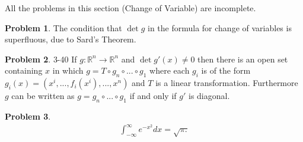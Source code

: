 \documentclass[20pt]{article}
\theoremstyle{plain}
\theoremstyle{definition}
\newtheorem*{problem}{Problem}
\newcommand{\reals}{\mathbb{R}}
\begin{document}
\color{Blue}
All the problems in this section (Change of Variable) are incomplete.
\color{Black}

\begin{problem}{3.39}
  The condition that $\det g$ in the formula for change of variables is
  superfluous, due to Sard's Theorem.
\end{problem}



\begin{problem}{3-40}
  If $g: \reals^n \to \reals^n$ and $\det g'(x) \neq 0$ then
  there is an open set containing $x$ in which
  $g = T \circ g_n \circ ... \circ g_1$ where each $g_i$
  is of the form $g_i(x) = (x^i, ..., f_i(x^i), ..., x^n)$
  and $T$ is a linear transformation.  Furthermore $g$ can be written as $g = g_n \circ...\circ g_1$ if and only if $g'$ is
  diagonal.
\end{problem}

\begin{problem}
  \begin{align*}
    \int_{-\infty}^\infty e^{-x^2}dx = \sqrt{\pi.}
  \end{align*}
\end{problem}

\end{document}
